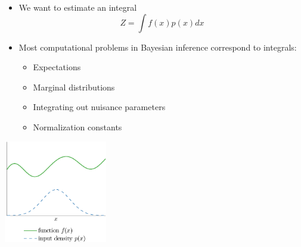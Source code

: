 \documentclass[usenames,dvipsnames]{beamer}
\begin{document}



\begin{frame}[plain, t]
	\titlebodyskip
	\headerbar
	{

	}
	\bodyheaderskip
	\slidebody
	{
		\columnbody{\standardtwocolumnwidth}
		{		
			\begin{itemize}
		\item We want to estimate an integral $$Z = \int f(x) p(x) dx$$		
		\item Most computational problems in Bayesian inference correspond to integrals:
			\begin{itemize}
			\item Expectations
			\item Marginal distributions
			\item Integrating out nuisance parameters
			\item Normalization constants
		\end{itemize}			
	
			\end{itemize}   		
		}
		\spacer{\standardspace}
		\columnbody{\standardtwocolumnwidth}
		{
			\vskip10pt
       		\includegraphics[width=4.5cm]{figures/samples/no_sample}	
		}
	}
\end{frame}
\end{document}
